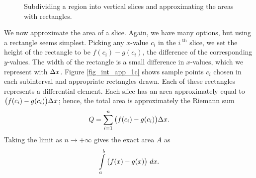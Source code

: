 \begin{figure}[H]
\centering
\qquad
{}
\qquad
{}
\caption{Subdividing a region into vertical slices and approximating the areas with rectangles.}
\end{figure}


We now approximate the area of a slice. Again, we have many options, but using a rectangle seems simplest. Picking any $x$-value $c_i$ in the $i^\text{ th}$ slice, we set the height of the rectangle to be $f(c_i)-g(c_i)$, the difference of the corresponding $y$-values. The width of the rectangle is a small difference in $x$-values, which we represent with $\Delta x$. Figure \ref{fig_int_app_1c}  shows sample points $c_i$ chosen in each subinterval and appropriate rectangles drawn. Each of these rectangles represents a differential element. Each slice has an area approximately equal to $\big(f(c_i)-g(c_i)\big)\Delta x$; hence, the total area is approximately the Riemann sum
$$Q = \sum_{i=1}^n \big(f(c_i)-g(c_i)\big)\Delta x.$$
Taking the limit as $n\to +\infty$ gives the exact area $A$ as 
\begin{equation}
\ds\int\limits_a^b \big(f(x)-g(x)\big)\ dx.
\label{eq_area}
\end{equation}

